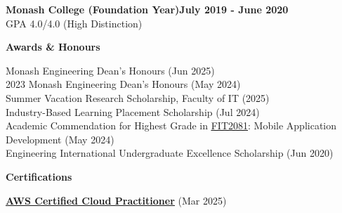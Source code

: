 \documentclass[11pt, a4paper]{article}
\let\hrefnoul\href
\renewcommand{\href}[2]{\hrefnoul{#1}{\ul{#2}}}
\newcommand{\resumesection}[1]{%
  \vspace{6pt}\par
  {\setlength{\fboxsep}{5pt}%
   \noindent\colorbox{sectionbg}{%
     \parbox{\dimexpr\linewidth-10pt\relax}{\strut\textbf{\large #1}\strut}%
   }}%
  \vspace{2pt}\par
}
\begin{document}
\vspace{3pt}
\noindent\textbf{Monash College (Foundation Year)}\hfill\textbf{July 2019 - June 2020}\\
GPA 4.0/4.0 (High Distinction)

\resumesection{Awards \& Honours}

\vspace{3pt}
 Monash Engineering Dean's Honours (Jun 2025)\\
2023 Monash Engineering Dean's Honours (May 2024)\\
Summer Vacation Research Scholarship, Faculty of IT (2025)\\
Industry-Based Learning Placement Scholarship (Jul 2024)\\
Academic Commendation for Highest Grade in
\href{https://handbook.monash.edu/2024/units/FIT2081}{FIT2081}:
Mobile Application Development (May 2024)\\
Engineering International Undergraduate Excellence Scholarship (Jun 2020)

\resumesection{Certifications}

\vspace{3pt}
\noindent\href{https://aws.amazon.com/certification/certified-cloud-practitioner/}{\textbf{AWS Certified Cloud Practitioner}}
(Mar 2025)

\end{document}
